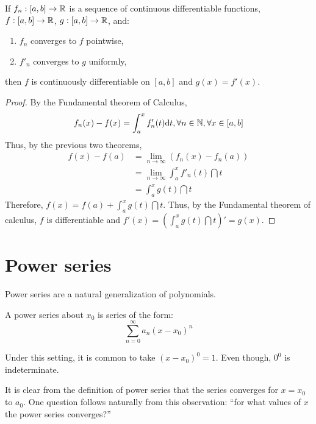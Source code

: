 \begin{theorem}
    If $f_n: [a,b] \to \mathbb{R}$ is a sequence of continuous differentiable functions, $f: [a,b] \to \mathbb{R}$, $g:[a,b] \to \mathbb{R}$, and:
    \begin{enumerate}
        \item $f_n$ converges to $f$ pointwise,
        \item $f'_n$ converges to $g$ uniformly,
    \end{enumerate}
    then $f$ is continuously differentiable on $[a,b]$ and $g(x) = f'(x)$.
\end{theorem}

\begin{proof}
    By the Fundamental theorem of Calculus,
    \begin{equation*}
        f_n(x) - f(x) = \int_a^x f'_n(t)\text{d} t, \forall n \in \mathbb{N}, \forall x \in [a,b]
    \end{equation*}
    Thus, by the previous two theorems,
    \begin{align*}
        f(x) - f(a) &= \lim \limits_{n \to \infty} (f_n(x) - f_n(a)) \\
        &= \lim \limits_{n \to \infty} \int_a^x f'_n(t) \dint t \\
        &= \int_a^x g(t) \dint t
    \end{align*}
    Therefore, $f(x) = f(a) + \int_a^x g(t) \dint t$. Thus, by the Fundamental theorem of calculus, $f$ is differentiable and $f'(x) = (\int_a^x g(t) \dint t)' = g(x)$.
\end{proof}

\section{Power series}

Power series are a natural generalization of polynomials.

\begin{definition}
    A power series about $x_0$ is series of the form:
    \begin{equation*}
        \sum \limits_{n = 0}^\infty a_n(x - x_0)^n
    \end{equation*}
\end{definition}

\begin{remark}
    Under this setting, it is common to take $(x-x_0)^0 = 1$. Even though, $0^0$ is indeterminate.
\end{remark}

It is clear from the definition of power series that the series converges for $x=x_0$ to $a_0$. One question follows naturally from this observation: ``for what values of $x$ the power series converges?''

